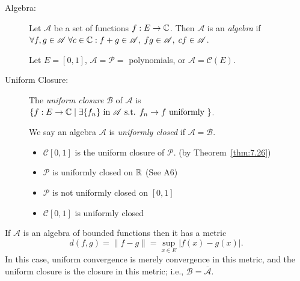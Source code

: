 \begin{define}[28]
	\hfill
	\begin{description}
		\item[Algebra:]Let $\mathscr{A}$ be a set of functions $f:E\to \mathbb{C}$. Then $\mathscr{A}$ is an \textit{algebra} if $\forall{f,g \in \mathscr{A}}\;\forall{c \in \ensuremath{\mathbb{C}}}: f+g \in \mathscr{A}, \; fg \in \mathscr{A}, \; cf \in \mathscr{A}$.
		      \begin{example}
			      Let $E=[0,1]$, $\mathscr{A}=\mathscr{P}=$ polynomials, or $\mathscr{A}=\mathscr{C}(E)$.
		      \end{example}
		\item[Uniform Closure:] The \textit{uniform closure} $\mathscr{B}$ of $\mathscr{A}$ is $\{f: E\to \mathbb{C} \;| \; \exists{\{ {f}_{n}\} \text{ in }  \mathscr{A}} \text{ s.t. } f_{n}\to f \text{ uniformly }\}$. 
			\begin{note}
				We say an algebra $\mathscr{A}$ is \textit{uniformly closed} if $\mathscr{A}=\mathscr{B}$.
			\end{note}
		      \begin{example}
			      \begin{itemize}
				      \item $\mathscr{C}[0,1]$ is the uniform closure of $\mathscr{P}$. (by Theorem~\ref{thm:7.26})
				      \item $\mathscr{P}$ is uniformly closed on $\mathbb{R}$ (See A6)
				      \item $\mathscr{P}$ is not uniformly closed on $[0,1]$
				      \item $\mathscr{C}[0,1]$ is uniformly closed
			      \end{itemize}
		      \end{example}
	\end{description}
	\begin{note}
		If $\mathscr{A}$ is an algebra of bounded functions then it has a metric
		\[
			d(f,g)= \|f-g\|=\sup_{x \in E}{\left|f(x)-g(x)\right|}
			.\]
		In this case, uniform convergence is merely convergence in this metric, and the uniform closure is the closure in this metric; i.e., $\mathscr{B}=\overline{\mathscr{A}}$.
	\end{note}
\end{define}
